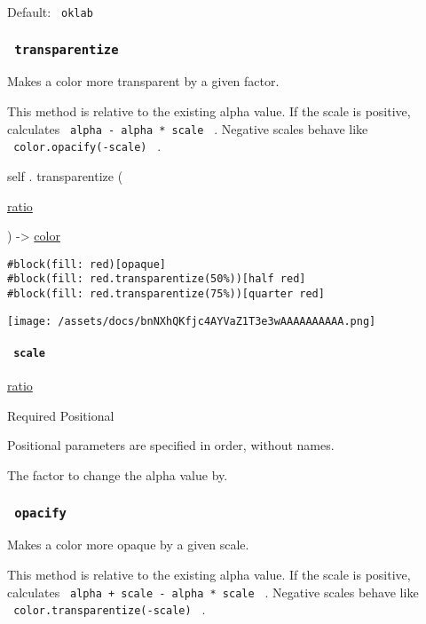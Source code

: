 Default: \texttt{\ oklab\ }

\subsubsection{\texorpdfstring{\texttt{\ transparentize\ }}{ transparentize }}\label{definitions-transparentize}

Makes a color more transparent by a given factor.

This method is relative to the existing alpha value. If the scale is
positive, calculates \texttt{\ alpha\ -\ alpha\ *\ scale\ } . Negative
scales behave like \texttt{\ color.opacify(-scale)\ } .

self { . } { transparentize } (

{ \href{/docs/reference/layout/ratio/}{ratio} }

) -\textgreater{} \href{/docs/reference/visualize/color/}{color}

\begin{verbatim}
#block(fill: red)[opaque]
#block(fill: red.transparentize(50%))[half red]
#block(fill: red.transparentize(75%))[quarter red]
\end{verbatim}

\texttt{[image: /assets/docs/bnNXhQKfjc4AYVaZ1T3e3wAAAAAAAAAA.png]}

\paragraph{\texorpdfstring{\texttt{\ scale\ }}{ scale }}\label{definitions-transparentize-scale}

\href{/docs/reference/layout/ratio/}{ratio}

{Required} {{ Positional }}

\label{definitions-transparentize-scale-positional-tooltip}
Positional parameters are specified in order, without names.

The factor to change the alpha value by.

\subsubsection{\texorpdfstring{\texttt{\ opacify\ }}{ opacify }}\label{definitions-opacify}

Makes a color more opaque by a given scale.

This method is relative to the existing alpha value. If the scale is
positive, calculates \texttt{\ alpha\ +\ scale\ -\ alpha\ *\ scale\ } .
Negative scales behave like \texttt{\ color.transparentize(-scale)\ } .


